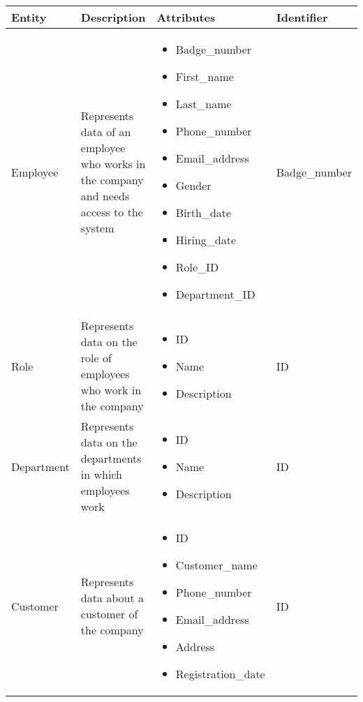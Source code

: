 \begin{longtable}{|p{}|p{} |p{}|p{} |}
    \hline
    \textbf{Entity} & \textbf{Description} & \textbf{Attributes} & \textbf{Identifier}  \\\hline

    Employee & Represents data of an employee who works in the company and needs access to the system &
    \begin{itemize}
        \vspace{-1em}
        \item Badge\_number
        \item First\_name
        \item Last\_name
        \item Phone\_number
        \item Email\_address
        \item Gender
        \item Birth\_date
        \item Hiring\_date
        \item Role\_ID
        \item Department\_ID
    \end{itemize}
    &  Badge\_number \\\hline

    Role & Represents data on the role of employees who work in the company &
    \begin{itemize}
        \vspace{-1em}
        \item ID
        \item Name
        \item Description
    \end{itemize}
    &  ID \\\hline

    Department & Represents data on the departments in which employees work &
    \begin{itemize}
        \vspace{-1em}
        \item ID
        \item Name
        \item Description
    \end{itemize}
    &  ID \\\hline

    Customer & Represents data about a customer of the company &
    \begin{itemize}
        \vspace{-1em}
        \item ID
        \item Customer\_name
        \item Phone\_number
        \item Email\_address
        \item Address
        \item Registration\_date
    \end{itemize}
    &  ID \\\hline


\end{longtable}
